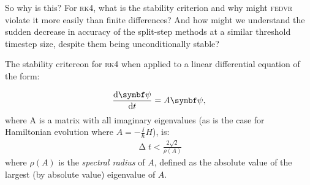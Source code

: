 So why is this? For \textsc{rk4}, what is the stability criterion and why might \textsc{fedvr} violate it more easily than finite differences? And how might we understand the sudden decrease in accuracy of the split-step methods at a similar threshold timestep size, despite them being unconditionally stable?

The stability critereon for \textsc{rk4} when applied to a linear differential equation of the form:

\begin{align}
\dv{\vec\psi}{t} = A\vec\psi,
\end{align}
where A is a matrix with all imaginary eigenvalues (as is the case for Hamiltonian evolution where $A=-\frac \ii \hbar H$), is\cite{caplan_numerical_2011-1}:
\begin{align}
\upDelta t < \frac{2 \sqrt 2}{\rho(A)}
\end{align}
where $\rho(A)$ is the \emph{spectral radius} of $A$, defined as the absolute value of the largest (by absolute value) eigenvalue of $A$.

